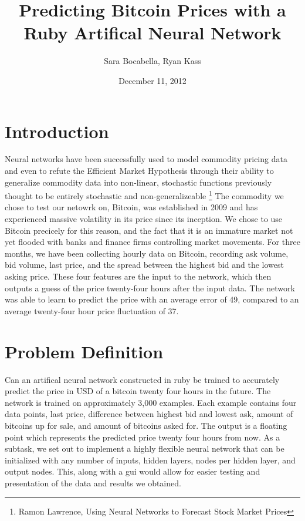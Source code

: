 \documentclass[a4paper,10pt]{article}
\title{Predicting Bitcoin Prices with a Ruby Artifical Neural Network}
\author{Sara Bocabella, Ryan Kass}
\date{December 11, 2012}
\begin{document}
\maketitle
\section{Introduction}
Neural networks have been successfully used to
model commodity pricing data and even to refute the Efficient Market Hypothesis
through their ability to generalize commodity data into non-linear, 
stochastic functions previously thought to be entirely stochastic and non-generalizeable
\footnote{Ramon Lawrence, Using Neural Networks to Forecast Stock Market Prices}
The commodity we chose to test our netowrk on, Bitcoin, was established in 2009 and has 
experienced massive volatility in its price since its inception.  We chose to use Bitcoin 
precicely for this reason, and the fact that it is an immature market not yet flooded with
banks and finance firms controlling market movements.
\newline \newline
For three months, we have been collecting hourly data on Bitcoin, recording
ask volume, bid volume, last price, and the spread between the highest bid and the lowest asking price.
These four features are the input to the network, which then outputs a guess of the price twenty-four
hours after the input data.  The network was able to learn to predict the price with an average error
of 49\cent, compared to an average twenty-four hour price fluctuation of 37\cent. 
\section{Problem Definition}
Can an artifical neural network constructed in ruby be trained to accurately predict the price in USD
of a bitcoin twenty four hours in the future.  The network is trained on approximately 3,000 examples.
Each example contains four data points, last price, difference between highest bid and lowest ask,
amount of bitcoins up for sale, and amount of bitcoins asked for.  The output is a floating point which
represents the predicted price twenty four hours from now.  As a subtask, we set out to implement a highly
flexible neural network that can be initialized with any number of inputs, hidden layers, nodes per hidden
layer, and output nodes.  This, along with a gui would allow for easier testing and presentation of the 
data and results we obtained.
\end{document}
